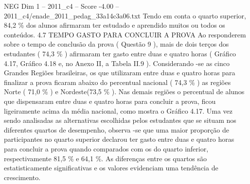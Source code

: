 \begin{textsample}{NEG Dim 1 – 2011\_c4 – Score -4.00 – 2011\_c4/enade\_2011\_pedag\_33a14c3a06.txt}
Tendo em conta o quarto superior, 84,2 \% dos alunos afirmaram ter estudado e aprendido muitos ou todos os conteúdos. 4.7 TEMPO GASTO PARA CONCLUIR A PROVA Ao responderem sobre o tempo de conclusão da prova ( Questão 9 ), mais de dois terços dos estudantes ( 74,3 \% ) afirmaram ter gasto entre duas e quatro horas ( Gráfico 4.17, Gráfico 4.18 e, no Anexo II, a Tabela II.9 ).
Considerando -se as cinco Grandes Regiões brasileiras, os que utilizaram entre duas e quatro horas para finalizar a prova ficaram abaixo do percentual nacional ( 74,3 \% ) as regiões Norte ( 71,0 \% ) e Nordeste(73,5 \% ).
Nas demais regiões o percentual de alunos que dispensaram entre duas e quatro horas para concluir a prova, ficou ligeiramente acima da média nacional, como mostra o Gráfico 4.17.
Uma vez sendo analisadas as alternativas escolhidas pelos estudantes que se situam nos diferentes quartos de desempenho, observa -se que uma maior proporção de participantes no quarto superior declarou ter gasto entre duas e quatro horas para concluir a prova quando comparados com os do quarto inferior, respectivamente 81,5 \% e 64,1 \%.
As diferenças entre os quartos são estatisticamente significativas e os valores evidenciam uma tendência de crescimento.

\end{textsample}
